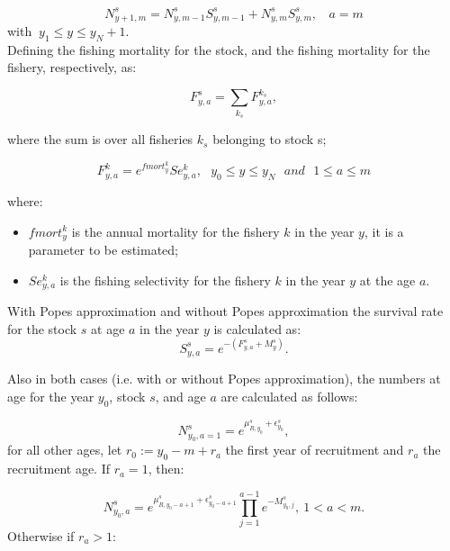 \documentclass{article}
\begin{document}
\begin{equation}
N^s_{y+1,m}=N^s_{y,m-1}S^s_{y,m-1}+N^s_{y,m}S^s_{y,m}, \ \ \ \ a = m
\end{equation}
with $\ y_1\leq y \leq y_N+1$.\\

Defining the fishing mortality for the stock, and the fishing mortality for the fishery, respectively, as:

\begin{equation} \label{eq: fs2}
F^s_{y,a} = \sum_{k_s}F^{k_s}_{y,a}, 
\end{equation}

where the sum is over all fisheries $k_s$ belonging to stock s;


\begin{equation}
F^k_{y,a}=e^{fmort^k_y}Se^k_{y,a}, \ \ \ y_0\leq y \leq y_N \ \ \ and  \ \ \  1\leq a \leq m
\end{equation}

where:
\begin{itemize}

    
    \item $fmort^k_y$ is the annual mortality for the fishery $k$ in the year $y$, it is a parameter to be estimated;
    \item $Se^k_{y,a}$ is the fishing selectivity for the fishery $k$ in the year $y$ at the age $a$.

\end{itemize}

\hfill
With Popes approximation and without Popes approximation the survival rate for the stock $s$ at age $a$ in the year $y$ is calculated as:
\begin{equation}
S^s_{y,a}=e^{-(F^s_{y,a}+M^s_{y})}.
\end{equation}

Also in both cases (i.e. with or without Popes approximation), the numbers at age for the year $y_0$, stock $s$, and age $a$ are calculated as follows:

\begin{equation}
N^s_{y_0,a=1}=e^{\mu^s_{R,y_0} + \epsilon^s_{y_0}},
\end{equation}
for all other ages, let $r_0 := y_0-m+r_a$ the first year of recruitment and $r_a$ the recruitment age. If $r_a=1$, then:

\begin{equation}
N^s_{y_0,a}=e^{\mu_{R,y_0-a+1}^s + \epsilon^s_{y_0-a+1}}
            \prod_{j=1}^{a-1}e^{-M^s_{y_0,j}}, \ 1<a<m.
\end{equation}
Otherwise if $r_a>1$:
\end{document}
